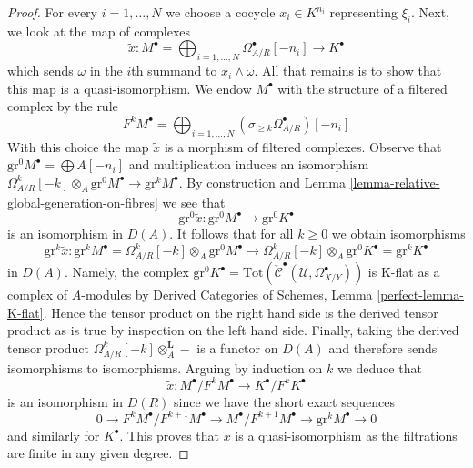 \documentclass[10pt,a4paper]{amsart}
\theoremstyle{plain}
\theoremstyle{definition}
\theoremstyle{remark}
\numberwithin{equation}{subsection}
\begin{document}
\begin{proof}
\medskip\noindent
For every $i = 1, \ldots, N$ we choose a cocycle $x_i \in K^{n_i}$
representing $\xi_i$. Next, we look at the map of complexes
$$
\tilde x :
M^\bullet = \bigoplus\nolimits_{i = 1, \ldots, N}
\Omega^\bullet_{A/R}[-n_i]
\longrightarrow
K^\bullet
$$
which sends $\omega$ in the $i$th summand to $x_i \wedge \omega$.
All that remains is to show that this map is a quasi-isomorphism.
We endow $M^\bullet$ with the structure of a filtered complex
by the rule
$$
F^kM^\bullet =
\bigoplus\nolimits_{i = 1, \ldots, N}
(\sigma_{\geq k}\Omega^\bullet_{A/R})[-n_i]
$$
With this choice the map $\tilde x$ is a morphism of filtered complexes.
Observe that $\text{gr}^0M^\bullet = \bigoplus A[-n_i]$
and multiplication induces an isomorphism
$\Omega^k_{A/R}[-k] \otimes_A \text{gr}^0M^\bullet \to \text{gr}^kM^\bullet$.
By construction and Lemma \ref{lemma-relative-global-generation-on-fibres}
we see that
$$
\text{gr}^0\tilde x :
\text{gr}^0M^\bullet \longrightarrow
\text{gr}^0K^\bullet
$$
is an isomorphism in $D(A)$. It follows that for all $k \geq 0$
we obtain isomorphisms
$$
\text{gr}^k \tilde x :
\text{gr}^kM^\bullet = \Omega^k_{A/R}[-k] \otimes_A \text{gr}^0M^\bullet
\longrightarrow
\Omega^k_{A/R}[-k] \otimes_A \text{gr}^0K^\bullet =
\text{gr}^kK^\bullet
$$
in $D(A)$. Namely, the complex
$\text{gr}^0K^\bullet =
\text{Tot}(\check{\mathcal{C}}^\bullet(\mathcal{U}, \Omega_{X/Y}^\bullet))$
is K-flat as a complex of $A$-modules by Derived Categories of Schemes,
Lemma \ref{perfect-lemma-K-flat}.
Hence the tensor product on the right hand side is the
derived tensor product as is true by inspection on the left hand side.
Finally, taking the derived tensor product
$\Omega^k_{A/R}[-k] \otimes_A^\mathbf{L} -$ is a functor on $D(A)$
and therefore sends isomorphisms to isomorphisms.
Arguing by induction on $k$ we deduce that
$$
\tilde x : M^\bullet/F^kM^\bullet \to K^\bullet/F^kK^\bullet
$$
is an isomorphism in $D(R)$ since we have the short exact sequences
$$
0 \to F^kM^\bullet/F^{k + 1}M^\bullet \to
M^\bullet/F^{k + 1}M^\bullet \to
\text{gr}^kM^\bullet \to 0
$$
and similarly for $K^\bullet$. This proves that $\tilde x$ is a
quasi-isomorphism as the filtrations are finite in any given degree.
\end{proof}
\end{document}
